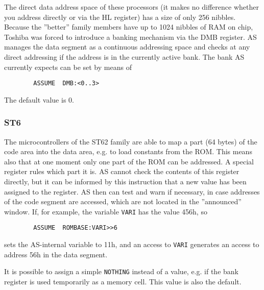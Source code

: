 \documentclass[12pt,twoside]{report}
\newcommand{\tty}[1]{{\tt #1}}
\begin{document}
The direct data address space of these processors (it makes no
difference whether you address directly or via the HL register) has a
size of only 256 nibbles.  Because the ''better'' family members have
up to 1024 nibbles of RAM on chip, Toshiba was forced to introduce a
banking mechanism via the DMB register.  AS manages the data segment
as a continuous addressing space and checks at any direct addressing
if the address is in the currently active bank.  The bank AS
currently expects can be set by means of
\begin{verbatim}
        ASSUME  DMB:<0..3>
\end{verbatim}
The default value is 0.


\subsubsection{ST6}
\label{ST6Assume}

The microcontrollers of the ST62 family are able to map a part (64 bytes)
of the code area into the data area, e.g. to load constants from the ROM.
This means also that at one moment only one part of the ROM can be
addressed.  A special register rules which part it is.  AS cannot check
the contents of this register directly, but it can be informed by this
instruction that a new value has been assigned to the register.  AS then
can test and warn if necessary, in case addresses of the code segment are
accessed, which are not located in the ''announced'' window.  If, for
example, the variable \tty{VARI} has the value 456h, so
\begin{verbatim}
        ASSUME  ROMBASE:VARI>>6
\end{verbatim}
sets the AS-internal variable to 11h, and an access to \tty{VARI}
generates an access to address 56h in the data segment.

It is possible to assign a simple \tty{NOTHING} instead of a value, e.g.
if the bank register is used temporarily as a memory cell.  This value is
also the default.
\end{document}
